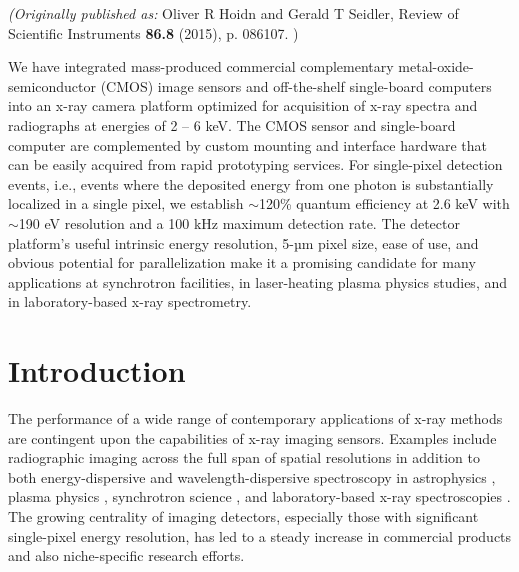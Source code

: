 \emph{(Originally published as: }
Oliver R Hoidn and Gerald T Seidler, Review of Scientific Instruments {\bfseries 86.8}
(2015), p. 086107.
)

\begin{addmargin}[4em]{1em}
We have integrated mass-produced commercial complementary
metal-oxide-semiconductor (CMOS) image sensors and off-the-shelf
single-board computers into an x-ray camera platform optimized for
acquisition of x-ray spectra and radiographs at energies of 2 -- 6 keV.
The CMOS sensor and single-board computer are complemented by custom
mounting and interface hardware that can be easily acquired from rapid
prototyping services. For single-pixel detection events, i.e., events
where the deposited energy from one photon is substantially localized in
a single pixel, we establish $\sim$120\% quantum efficiency at
2.6 keV with $\sim$190 eV resolution and a 100 kHz maximum
detection rate. The detector platform's useful intrinsic energy
resolution, 5-µm pixel size, ease of use, and obvious potential for parallelization make
it a promising candidate for many applications at synchrotron
facilities, in laser-heating plasma physics studies, and in
laboratory-based x-ray spectrometry.
\end{addmargin}


\section{Introduction}
The performance of a wide range of contemporary applications of x-ray
methods are contingent upon the capabilities of x-ray imaging sensors.
Examples include radiographic imaging across the full span of spatial
resolutions in addition to both energy-dispersive and
wavelength-dispersive spectroscopy in
astrophysics , plasma
physics \cite{PLATEAU2012LOW}, synchrotron
science \cite{HUOTARI2005IMPROVING}, and
laboratory-based x-ray
spectroscopies . The
growing centrality of imaging detectors, especially those with
significant single-pixel energy resolution, has led to a steady increase
in commercial products and also niche-specific research efforts.

